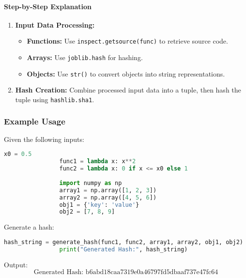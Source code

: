 \documentclass{article}
\begin{document}
			\paragraph{Step-by-Step Explanation}
			\begin{enumerate}
				\item \textbf{Input Data Processing:}
				\begin{itemize}
					\item \textbf{Functions:} Use \texttt{inspect.getsource(func)} to retrieve source code.
					\item \textbf{Arrays:} Use \texttt{joblib.hash} for hashing.
					\item \textbf{Objects:} Use \texttt{str()} to convert objects into string representations.
				\end{itemize}
				\item \textbf{Hash Creation:} Combine processed input data into a tuple, then hash the tuple using \texttt{hashlib.sha1}.
			\end{enumerate}
			
			\subsubsection{Example Usage}
			
			Given the following inputs:
			\begin{lstlisting}[language=Python]
				x0 = 0.5
				func1 = lambda x: x**2
				func2 = lambda x: 0 if x <= x0 else 1
				
				import numpy as np
				array1 = np.array([1, 2, 3])
				array2 = np.array([4, 5, 6])
				obj1 = {'key': 'value'}
				obj2 = [7, 8, 9]
			\end{lstlisting}
			
			Generate a hash:
			\begin{lstlisting}[language=Python]
				hash_string = generate_hash(func1, func2, array1, array2, obj1, obj2)
				print("Generated Hash:", hash_string)
			\end{lstlisting}
			
			Output:
			\[
			\text{Generated Hash: b6abd18caa7319e0a46797fd5dbaaf737e47fc64}
			\]
			
\end{document}
